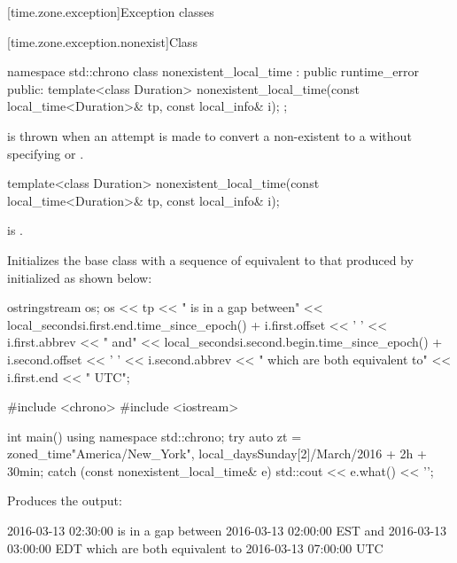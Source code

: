 [time.zone.exception]{Exception classes}

[time.zone.exception.nonexist]{Class }

\begin{codeblock}
namespace std::chrono {
  class nonexistent_local_time : public runtime_error {
  public:
    template<class Duration>
      nonexistent_local_time(const local_time<Duration>& tp, const local_info& i);
  };
}
\end{codeblock}

\pnum
{} is thrown when
an attempt is made
to convert a non-existent  to a 
without specifying  or .

%
\begin{itemdecl}
template<class Duration>
  nonexistent_local_time(const local_time<Duration>& tp, const local_info& i);
\end{itemdecl}

\begin{itemdescr}
\pnum
\expects
{} is .

\pnum
\effects
Initializes the base class with a sequence of 
equivalent to that produced by 
initialized as shown below:
\begin{codeblock}
ostringstream os;
os << tp << " is in a gap between\n"
   << local_seconds{i.first.end.time_since_epoch()} + i.first.offset << ' '
   << i.first.abbrev << " and\n"
   << local_seconds{i.second.begin.time_since_epoch()} + i.second.offset << ' '
   << i.second.abbrev
   << " which are both equivalent to\n"
   << i.first.end << " UTC";
\end{codeblock}

\pnum
\begin{example}
\begin{codeblock}
#include <chrono>
#include <iostream>

int main() {
  using namespace std::chrono;
  try {
    auto zt = zoned_time{"America/New_York",
                         local_days{Sunday[2]/March/2016} + 2h + 30min};
  } catch (const nonexistent_local_time& e) {
    std::cout << e.what() << '\n';
  }
}
\end{codeblock}

Produces the output:
\begin{outputblock}
2016-03-13 02:30:00 is in a gap between
2016-03-13 02:00:00 EST and
2016-03-13 03:00:00 EDT which are both equivalent to
2016-03-13 07:00:00 UTC
\end{outputblock}
\end{example}
\end{itemdescr}

